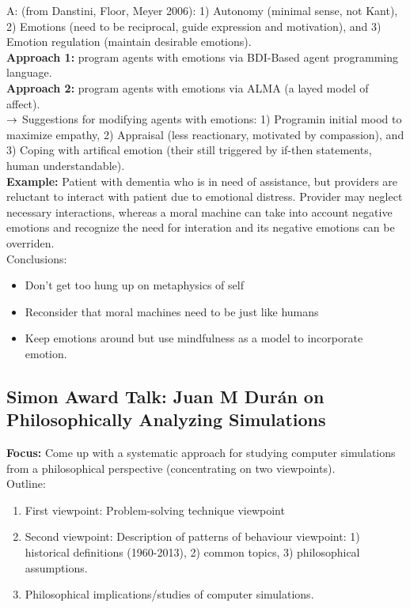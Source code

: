 A: (from Danstini, Floor, Meyer 2006): 1) Autonomy (minimal sense, not Kant), 2) Emotions (need to be reciprocal, guide expression and motivation), and 3) Emotion regulation (maintain desirable emotions). \\

{\bf Approach 1:} program agents with emotions via BDI-Based agent programming language. \\
{\bf Approach 2:} program agents with emotions via ALMA (a layed model of affect). \\

$\rightarrow$ Suggestions for modifying agents with emotions: 1) Programin initial mood to maximize empathy, 2) Appraisal (less reactionary, motivated by compassion), and 3) Coping with artifical emotion (their still triggered by if-then statements, human understandable). \\

{\bf Example:} Patient with dementia who is in need of assistance, but providers are reluctant to interact with patient due to emotional distress. Provider may neglect necessary interactions, whereas a moral machine can take into account negative emotions and recognize the need for interation and its negative emotions can be overriden. \\

Conclusions:
\begin{itemize}
\item Don't get too hung up on metaphysics of self
\item Reconsider that moral machines need to be just like humans
\item Keep emotions around but use mindfulness as a model to incorporate emotion.
\end{itemize}

\spacerule
\subsection{Simon Award Talk: Juan M Dur{\' a}n on Philosophically Analyzing Simulations}

{\bf Focus:} Come up with a systematic approach for studying computer simulations from a philosophical perspective (concentrating on two viewpoints). \\

Outline:
\begin{enumerate}
	\item First viewpoint: Problem-solving technique viewpoint
	\item Second viewpoint: Description of patterns of behaviour viewpoint: 1) historical definitions (1960-2013), 2) common topics, 3) philosophical assumptions.
	\item Philosophical implications/studies of computer simulations.
\end{enumerate}



